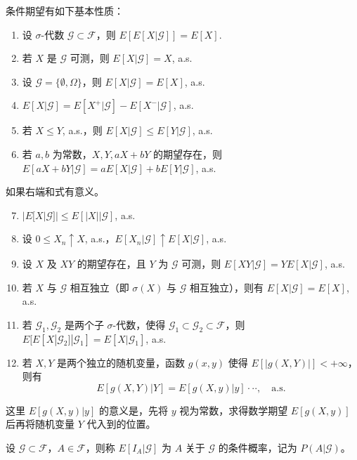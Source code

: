 \documentclass[lang=cn,10pt,thmcnt=section]{elegantbook}
\begin{document}
\begin{theorem}
	条件期望有如下基本性质：
\begin{enumerate}
    \item 设 $\sigma$-代数 $\mathcal{G} \subset \mathcal{F}$，则 $E[E[X|\mathcal{G}]] = E[X]$.
    \item 若 $X$ 是 $\mathcal{G}$ 可测，则 $E[X|\mathcal{G}] = X$, a.s.
    \item 设 $\mathcal{G} = \{\emptyset, \Omega\}$，则 $E[X|\mathcal{G}] = E[X]$, a.s.
    \item $E[X|\mathcal{G}] = E[X^+|\mathcal{G}] - E[X^-|\mathcal{G}]$, a.s.
    \item 若 $X \leq Y$, a.s.，则 $E[X|\mathcal{G}] \leq E[Y|\mathcal{G}]$, a.s.
    \item 若 $a, b$ 为常数，$X, Y, aX + bY$ 的期望存在，则 $E[aX + bY|\mathcal{G}] = aE[X|\mathcal{G}] + bE[Y|\mathcal{G}]$, a.s.
\end{enumerate}
如果右端和式有意义。
\begin{enumerate}
    \setcounter{enumi}{6}
    \item $|E[X|\mathcal{G}]| \leq E[|X||\mathcal{G}]$, a.s.
    \item 设 $0 \leq X_n \uparrow X$, a.s.，$E[X_n|\mathcal{G}] \uparrow E[X|\mathcal{G}]$, a.s.
    \item 设 $X$ 及 $XY$ 的期望存在，且 $Y$ 为 $\mathcal{G}$ 可测，则 $E[XY|\mathcal{G}] = Y E[X|\mathcal{G}]$, a.s.
\end{enumerate}
\begin{enumerate}
    \setcounter{enumi}{9}
    \item 若 $X$ 与 $\mathcal{G}$ 相互独立（即 $\sigma(X)$ 与 $\mathcal{G}$ 相互独立），则有 $E[X|\mathcal{G}] = E[X]$, a.s.
    \item 若 $\mathcal{G}_1, \mathcal{G}_2$ 是两个子 $\sigma$-代数，使得 $\mathcal{G}_1 \subset \mathcal{G}_2 \subset \mathcal{F}$，则 $E[E[X|\mathcal{G}_2]|\mathcal{G}_1] = E[X|\mathcal{G}_1]$, a.s.
    \item 若 $X, Y$ 是两个独立的随机变量，函数 $g(x, y)$ 使得 $E[|g(X, Y)|] < +\infty$，则有
    \[
    E[g(X, Y)|Y] = E[g(X, y)|y] \cdot \cdot \cdot, \quad \text{a.s.}
    \]
\end{enumerate}
这里 $E[g(X, y)|y]$ 的意义是，先将 $y$ 视为常数，求得数学期望 $E[g(X, y)]$ 后再将随机变量 $Y$ 代入到的位置。
\end{theorem}
\begin{definition}
	设 $\mathcal{G} \subset \mathcal{F}$，$A \in \mathcal{F}$，则称 $E[I_A|\mathcal{G}]$ 为 $A$ 关于 $\mathcal{G}$ 的条件概率，记为 $P(A|\mathcal{G})$。
\end{definition}
\end{document}
